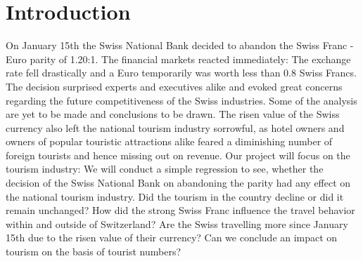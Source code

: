 \documentclass[12pt,a4paper,bibliography=totocnumbered,listof=totocnumbered]{scrartcl}
\begin{document}

\section{Introduction}



On January 15th the Swiss National Bank decided to abandon the Swiss Franc - Euro parity of 1.20:1. The financial markets reacted immediately: The exchange rate fell drastically and a Euro temporarily was worth less than 0.8 Swiss Francs. The decision surprised experts and executives alike and evoked great concerns regarding the future competitiveness of the Swiss industries. Some of the analysis are yet to be made and conclusions to be drawn. The risen value of the Swiss currency also left the national tourism industry sorrowful, as hotel owners and owners of popular touristic attractions alike feared a diminishing number of foreign tourists and hence missing out on revenue. Our project will focus on the tourism industry: We will conduct a simple regression to see, whether the decision of the Swiss National Bank on abandoning the parity had any effect on the national tourism industry. Did the tourism in the country decline or did it remain unchanged? How did the strong Swiss Franc influence the travel behavior within and outside of Switzerland? Are the Swiss travelling more since January 15th due to the risen value of their currency? Can we conclude an impact on tourism on the basis of tourist numbers? 
\end{document}
